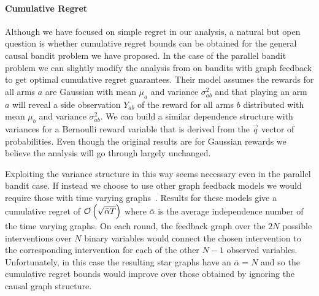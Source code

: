 \paragraph{Cumulative Regret}
Although we have focused on simple regret in our analysis, a natural but open question is whether cumulative regret bounds can be obtained for the general causal bandit problem we have proposed.
In the case of the parallel bandit problem we can slightly modify the analysis from \citep{wu2015online} on bandits with graph feedback to get optimal cumulative regret guarantees.
Their model assumes the rewards for all arms $a$ are Gaussian with mean $\mu_a$ and variance $\sigma^2_{ab}$ and that playing an arm $a$ will reveal a side observation $Y_{ab}$ of the reward for all arms $b$ distributed with mean $\mu_b$ and variance $\sigma^2_{ab}$.
We can build a similar dependence structure with variances for a Bernoulli reward variable that is derived from the $\vec{q}$ vector of probabilities.
Even though the original results are for Gaussian rewards we believe the analysis will go through largely unchanged.

Exploiting the variance structure in this way seems necessary even in the parallel bandit case.
If instead we choose to use other graph feedback models we would require those with time varying graphs~\citep{Alon2015,Kocak2014}.
Results for these models give a cumulative regret of $\mathcal{O}\left( \sqrt{\bar{\alpha} T} \right)$ where $\bar{\alpha}$ is the average independence number of the time varying graphs.
On each round, the feedback graph over the $2N$ possible interventions over $N$ binary variables would connect the chosen intervention to the corresponding intervention for each of the other $N-1$ observed variables.
Unfortunately, in this case the resulting star graphs have an $\bar{\alpha} = N$ and so the cumulative regret bounds would improve over those obtained by ignoring the causal graph structure.



